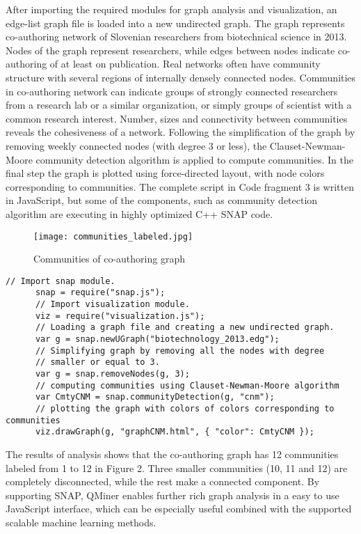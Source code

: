 \documentclass{article} %
\begin{document}
After importing the required modules for graph analysis and visualization, an edge-list graph file is loaded into a new undirected graph. The graph represents co-authoring network of Slovenian researchers from biotechnical science in 2013. Nodes of the graph represent researchers, while edges between nodes indicate co-authoring of at least on publication. Real networks often have community structure with several regions of internally densely connected nodes. Communities in co-authoring network can indicate groups of strongly connected researchers from a research lab or a similar organization, or simply groups of scientist with a common research interest. Number, sizes and connectivity between communities reveals the cohesiveness of a network. Following the simplification of the graph by removing weekly connected nodes (with degree 3 or less), the Clauset-Newman-Moore \cite{clauset-newman-moore} community detection algorithm is applied to compute communities. In the final step the graph is plotted using force-directed layout, with node colors corresponding to communities. The complete script in Code fragment 3 is written in JavaScript, but some of the components, such as community detection algorithm are executing in highly optimized C++ SNAP code.
\begin{figure}[h]
\begin{center}
\texttt{[image: communities\_labeled.jpg]}
\caption{Communities of co-authoring graph}
\end{center}
\end{figure}
      \begin{lstlisting}[caption=Graph analysis]
      // Import snap module.
      snap = require("snap.js");
      // Import visualization module.
      viz = require("visualization.js");
      // Loading a graph file and creating a new undirected graph.
      var g = snap.newUGraph("biotechnology_2013.edg");
      // Simplifying graph by removing all the nodes with degree
      // smaller or equal to 3.
      var g = snap.removeNodes(g, 3);
      // computing communities using Clauset-Newman-Moore algorithm
      var CmtyCNM = snap.communityDetection(g, "cnm");
      // plotting the graph with colors of colors corresponding to communities
      viz.drawGraph(g, "graphCNM.html", { "color": CmtyCNM });
      \end{lstlisting}
The results of analysis shows that the co-authoring graph has 12 communities labeled from 1 to 12 in Figure 2. Three smaller communities (10, 11 and 12) are completely disconnected, while the rest make a connected component. By supporting SNAP, QMiner enables further rich graph analysis in a easy to use JavaScript interface, which can be especially useful combined with the supported scalable machine learning methods.
\end{document}
